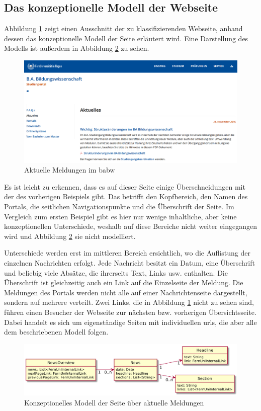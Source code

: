 \subsection{Das konzeptionelle Modell der Webseite}
    Abbildung \ref{image:findingNewsModelOverview} zeigt einen
    Ausschnitt der zu klassifizierenden Webseite,
    anhand dessen das konzeptionelle Modell der Seite erläutert wird.
    Eine Darstellung des Modells ist außerdem in Abbildung
    \ref{image:findingNewsModelUml} zu sehen.

    \begin{figure}[htb]
        \centering
        \includegraphics[width=\textwidth]{../resources/findings/case-study-2/news-overview.png}
        \caption{Aktuelle Meldungen im \acrshort{babw}}
        \label{image:findingNewsModelOverview}
    \end{figure}

    Es ist leicht zu erkennen, dass es auf dieser Seite einige Überschneidungen
    mit der des vorherigen Beispiels gibt.
    Das betrifft den Kopfbereich, den Namen des Portals,
    die seitlichen Navigationspunkte und die Überschrift der Seite.
    Im Vergleich zum ersten Beispiel gibt es hier nur wenige inhaltliche,
    aber keine konzeptionellen Unterschiede,
    weshalb auf diese Bereiche nicht weiter eingegangen wird und Abbildung
    \ref{image:findingNewsModelUml} sie nicht modelliert.

    Unterschiede werden erst im mittleren Bereich ersichtlich,
    wo die Auflistung der einzelnen Nachrichten erfolgt.
    Jede Nachricht besitzt ein Datum, eine Überschrift und beliebig viele Absätze,
    die ihrerseits Text, Links usw. enthalten.
    Die Überschrift ist gleichzeitig auch ein Link auf die Einzelseite der Meldung.
    Die Meldungen des Portals werden nicht alle auf einer Nachrichtenseite dargestellt,
    sondern auf mehrere verteilt.
    Zwei Links, die in Abbildung \ref{image:findingNewsModelOverview} nicht zu sehen sind,
    führen einen Besucher der Webseite zur nächsten bzw. vorherigen Übersichtsseite.
    Dabei handelt es sich um eigenständige Seiten mit individuellen \glspl{url},
    die aber alle dem beschriebenen Modell folgen.

    \begin{figure}[htb]
        \centering
        \includegraphics[scale=\imageScalingFactor]{../resources/findings/case-study-2/model.png}
        \caption{Konzeptionelles Modell der Seite über aktuelle Meldungen}
        \label{image:findingNewsModelUml}
    \end{figure}